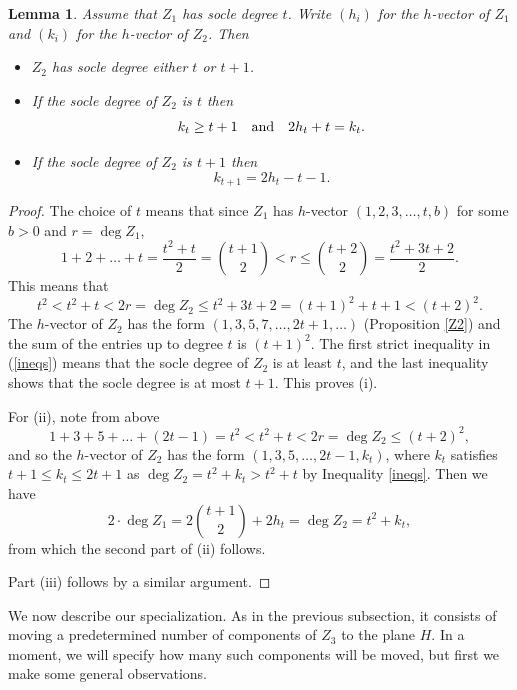 \documentclass[12pt]{amsart}%
\numberwithin{equation}{section}
\newtheorem{lemma}[theorem]{Lemma}
\theoremstyle{definition}
\numberwithin{equation}{section}
\begin{document}
\begin{lemma} \label{compare soc deg}
    Assume that $Z_1$ has socle degree $t$. Write $(h_i)$ for the $h$-vector of $Z_1$ and $(k_i)$ for the $h$-vector of $Z_2$. Then 
    
    \begin{itemize}
        \item[(i)] $Z_2$ has socle degree either $t$ or $t+1$.

        \item[(ii)] If the socle degree of $Z_2$ is $t$ then 
        \[
        k_t \geq t+1 \ \ \hbox{ and } \ \ 
2h_t +t = k_t.
\]

\item[(iii)] If the socle degree of $Z_2$ is $t+1$ then
\[
k_{t+1} = 2h_t -t-1 .
\]
    \end{itemize}
\end{lemma}

\begin{proof}

    The choice of $t$ means that since $Z_1$ has $h$-vector $(1,2,3,\dots,t,b)$ for some $b>0$ and $r = \deg Z_1$,
    \[
   1 + 2 + \dots + t = \frac{t^2+t}{2} = \binom{t+1}{2} < r \leq \binom{t+2}{2} = \frac{t^2+3t+2}{2}.
    \]
    This means that 
    \begin{equation} \label{ineqs}
    t^2 < t^2+t < 2r = \deg Z_2 \leq t^2+3t+2 = (t+1)^2 +t+1 < (t+2)^2.
    \end{equation}
    The $h$-vector of $Z_2$ has the form $(1,3,5,7,\dots, 2t+1,\dots)$ (Proposition \ref{Z2}) and the sum of the entries up to degree $t$ is $(t+1)^2$. The first strict inequality in (\ref{ineqs}) means that the socle degree of $Z_2$ is at least $t$, and the last inequality shows that the socle degree is at most $t+1$. This proves (i). 

    For (ii), note from above
    \[
  1+3+5+ \dots + (2t-1) =  t^2 < t^2+t < 2r = \deg Z_2 \leq (t+2)^2, 
    \]
    and so the $h$-vector of $Z_2$ has the form $(1,3,5,\dots,2t-1,k_t)$, where $k_t$ satisfies 
 $t+1 \leq k_t \leq 2t+1$ {as $\deg Z_2 = t^2 + k_t > t^2 + t$ by Inequality \eqref{ineqs}.}
Then we have
\[
2 \cdot \deg Z_1 = 2 \binom{t+1}{2} + 2h_t = \deg Z_2 = t^2 + k_t, 
\]
from which the second part of (ii) follows.

Part (iii) follows by a similar argument.
\end{proof}

We now describe our specialization. As in the previous subsection, it consists of moving a predetermined number of components of $Z_3$ to the plane $H$. In a moment, we will specify how many such components will be moved, but first we make some general observations.
\end{document}

